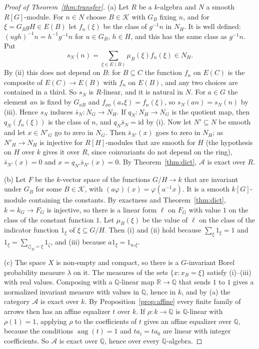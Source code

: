 \documentclass[11pt,a4paper]{article}
\theoremstyle{definition}
\newcommand{\A}{\mathcal{A}}
\newcommand{\K}{\mathcal{K}}
\newcommand{\Q}{\mathbb{Q}}
\newcommand{\R}{\mathbb{R}}
\newcommand{\aug}{\operatorname{aug}}
\newcommand{\id}{\mathrm{id}}
\begin{document}
\begin{proof}[Proof of Theorem~\ref{thm:transfer}]
(a) Let $R$ be a $k$-algebra and $N$ a smooth $R[G]$-module. For $n\in N$
choose $B\in\K$ with $G_B$ fixing $n$, and for $\xi=G_BgH\in E(B)$ let
$f_n(\xi)$ be the class of $g^{-1}n$ in $N_H$. It is well defined:
$(ugh)^{-1}n=h^{-1}g^{-1}n$ for $u\in G_B$, $h\in H$, and this has the same
class as $g^{-1}n$. Put
\[
 s_N(n)=\sum_{\xi\in E(B)}\mu_B(\xi)f_n(\xi)\in N_H .
\]
By (ii) this does not depend on $B$: for $B\subseteq C$ the function $f_n$
on $E(C)$ is the composite of $E(C)\to E(B)$ with $f_n$ on $E(B)$, and any
two choices are contained in a third. So $s_N$ is $R$-linear, and it is
natural in $N$. For $a\in G$ the element $an$ is fixed by $G_{aB}$ and
$f_{an}(a_*\xi)=f_n(\xi)$, so $s_N(an)=s_N(n)$ by (iii). Hence $s_N$ induces
$\bar s_N\colon N_G\to N_H$. If $q_N\colon N_H\to N_G$ is the quotient map,
then $q_N(f_n(\xi))$ is the class of $n$, and $q_N\bar s_N=\id$ by (i). Now
let $N'\subseteq N$ be smooth and let $x\in N'_G$ go to zero in $N_G$. Then
$\bar s_{N'}(x)$ goes to zero in $N_H$; as $N'_H\to N_H$ is injective for
$R[H]$-modules that are smooth for $H$ (the hypothesis on $H$ over $k$
gives it over $R$, since coinvariants do not depend on the ring),
$\bar s_{N'}(x)=0$ and $x=q_{N'}\bar s_{N'}(x)=0$. By Theorem~\ref{thm:dict},
$\A$ is exact over $R$.

(b) Let $F$ be the $k$-vector space of the functions $G/H\to k$ that are
invariant under $G_B$ for some $B\in\K$, with $(a\varphi)(x)=\varphi(a^{-1}x)$.
It is a smooth $k[G]$-module containing the constants. By exactness and
Theorem~\ref{thm:dict}, $k=k_G\to F_G$ is injective, so there is a linear
form $\ell$ on $F_G$ with value $1$ on the class of the constant function
$1$. Let $\mu_B(\xi)$ be the value of $\ell$ on the class of the indicator
function $1_\xi$ of $\xi\subseteq G/H$. Then (i) and (ii) hold because
$\sum_\xi1_\xi=1$ and $1_\xi=\sum_{\zeta|_B=\xi}1_\zeta$, and (iii) because
$a1_\xi=1_{a_*\xi}$.

(c) The space $X$ is non-empty and compact, so there is a $G$-invariant
Borel probability measure $\lambda$ on it. The measures of the sets
$\{x:x_B=\xi\}$ satisfy (i)--(iii) with real values. Composing with a
$\Q$-linear map $\R\to\Q$ that sends $1$ to $1$ gives a normalized invariant
measure with values in $\Q$, hence in $k$, and by (a) the category $\A$ is exact over $k$. By Proposition~\ref{prop:affine} every finite family of arrows then has an affine equalizer $t$ over $k$. If $\rho\colon k\to\Q$ is $\Q$-linear with $\rho(1)=1$, applying $\rho$ to the coefficients of $t$ gives an affine equalizer over $\Q$, because the conditions $\aug(t)=1$ and $ta_i=ta_0$ are linear with integer coefficients. So $\A$ is exact over $\Q$, hence over every $\Q$-algebra.
\end{proof}
\end{document}
